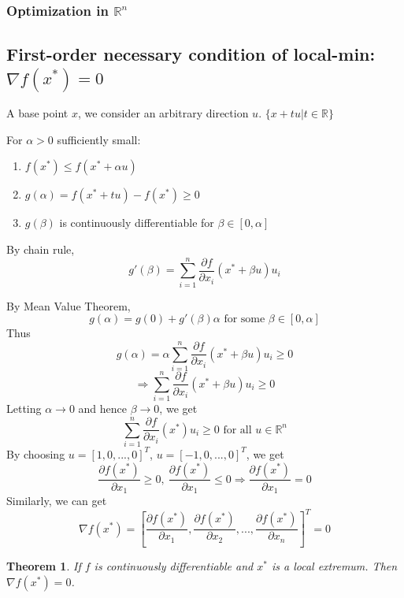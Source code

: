 \documentclass[11pt,a4paper]{article}
\newtheorem{theorem}{Theorem}
\begin{document}
\subsubsection{Optimization in $\mathbb{R}^n$}
\subsection*{First-order necessary condition of local-min: $\nabla f(x^*)=0$}
A base point $x$, we consider an arbitrary direction $u$. $\{x+tu| t\in \mathbb{R}\}$

For $\alpha>0$ sufficiently small:
\begin{enumerate}
    \item $f(x^*)\leq f(x^*+\alpha u)$
    \item $g(\alpha)=f(x^*+tu)-f(x^*)\geq 0$
    \item $g(\beta)$ is continuously differentiable for $\beta\in[0,\alpha]$
\end{enumerate}

By chain rule, $$g'(\beta)=\sum_{i=1}^n \frac{\partial f}{\partial x_i}(x^*+\beta u)u_i$$

By Mean Value Theorem, $$g(\alpha)=g(0)+g'(\beta)\alpha\text{ for some }\beta\in[0,\alpha]$$
Thus $$g(\alpha)=\alpha\sum_{i=1}^n \frac{\partial f}{\partial x_i}(x^*+\beta u)u_i\geq 0$$
$$\Rightarrow \sum_{i=1}^n \frac{\partial f}{\partial x_i}(x^*+\beta u)u_i\geq 0$$
Letting $\alpha \rightarrow	0$ and hence $\beta \rightarrow	0$, we get $$\sum_{i=1}^n \frac{\partial f}{\partial x_i}(x^*)u_i\geq 0\text{ for all }u\in \mathbb{R}^n$$
By choosing $u=[1,0,...,0]^T$, $u=[-1,0,...,0]^T$, we get $$\frac{\partial f(x^*)}{\partial x_1}\geq 0,\ \frac{\partial f(x^*)}{\partial x_1}\leq 0 \Rightarrow	\frac{\partial f(x^*)}{\partial x_1}= 0$$
Similarly, we can get $$\nabla f(x^*)=[\frac{\partial f(x^*)}{\partial x_1},\frac{\partial f(x^*)}{\partial x_2},...,\frac{\partial f(x^*)}{\partial x_n}]^T=0$$

\begin{theorem}
If $f$ is continuously differentiable and $x^*$ is a local extremum. Then $\nabla f(x^*)=0$.
\end{theorem}
\end{document}
